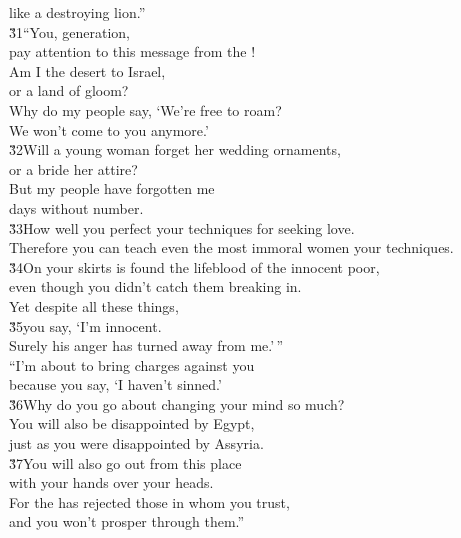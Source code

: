 \begin{poetry}
\poemll    like a destroying lion.'' \\
\poeml \v{31}``You, generation, \\
\poemll    pay attention to this message from the ! \\
\poeml Am I the desert to Israel, \\
\poemll    or a land of gloom? \\
\poeml Why do my people say, `We're free to roam? \\
\poemll    We won't come to you anymore.' \\
\poeml \v{32}Will a young woman forget her wedding ornaments, \\
\poemll    or a bride her attire? \\
\poeml But my people have forgotten me \\
\poemll    days without number. \\
\poeml \v{33}How well you perfect your techniques for seeking love. \\
\poemll    Therefore you can teach even the most immoral women your techniques. \\
\poeml \v{34}On your skirts is found the lifeblood of the innocent poor, \\
\poemll    even though you didn't catch them breaking in. \\
\poeml Yet despite all these things, \\
\poeml \v{35}you say, `I'm innocent. \\
\poemlll       Surely his anger has turned away from me.'\,'' \\
\poeml ``I'm about to bring charges against you \\
\poemll    because you say, `I haven't sinned.' \\
\poeml \v{36}Why do you go about changing your mind so much? \\
\poemll    You will also be disappointed by Egypt, \\
\poemlll       just as you were disappointed by Assyria. \\
\poeml \v{37}You will also go out from this place \\
\poemll    with your hands over your heads. \\
\poeml For the  has rejected those in whom you trust, \\
\poemll    and you won't prosper through them.''
\end{poetry}

